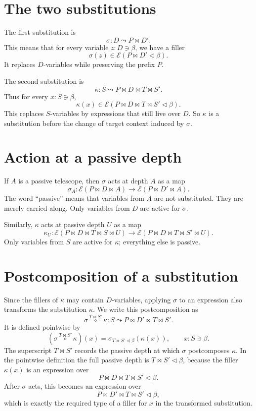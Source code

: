 \documentclass[11pt]{article}
\newcommand{\E}{\mathcal E}
\newcommand{\ext}{\mathbin{\triangleleft}}
\newcommand{\into}{\longrightarrow}
\newcommand{\pcomp}[3]{#1 \overset{#2}{\circ} #3}
\begin{document}
\section*{The two substitutions}

The first substitution is
\[
  \sigma : D \leadsto P \bowtie D'.
\]
This means that for every variable \(z : D \ni \beta\), we have a filler
\[
  \sigma(z) \in \E(P \bowtie D' \ext \beta).
\]
It replaces \(D\)-variables while preserving the prefix \(P\).

The second substitution is
\[
  \kappa : S \leadsto P \bowtie D \bowtie T \bowtie S'.
\]
Thus for every \(x : S \ni \beta\),
\[
  \kappa(x)
  \in
  \E(P \bowtie D \bowtie T \bowtie S' \ext \beta).
\]
This replaces \(S\)-variables by expressions that still live over \(D\).  So
\(\kappa\) is a substitution before the change of target context induced by
\(\sigma\).

\section*{Action at a passive depth}

If \(A\) is a passive telescope, then \(\sigma\) acts at depth \(A\) as a map
\[
  \sigma_A :
  \E(P \bowtie D \bowtie A)
  \into
  \E(P \bowtie D' \bowtie A).
\]
The word ``passive'' means that variables from \(A\) are not substituted.  They
are merely carried along.  Only variables from \(D\) are active for \(\sigma\).

Similarly, \(\kappa\) acts at passive depth \(U\) as a map
\[
  \kappa_U :
  \E(P \bowtie D \bowtie T \bowtie S \bowtie U)
  \into
  \E(P \bowtie D \bowtie T \bowtie S' \bowtie U).
\]
Only variables from \(S\) are active for \(\kappa\); everything else is passive.

\section*{Postcomposition of a substitution}

Since the fillers of \(\kappa\) may contain \(D\)-variables, applying \(\sigma\)
to an expression also transforms the substitution \(\kappa\).  We write this
postcomposition as
\[
  \pcomp{\sigma}{T \bowtie S'}{\kappa} :
  S \leadsto P \bowtie D' \bowtie T \bowtie S'.
\]
It is defined pointwise by
\[
  (\pcomp{\sigma}{T \bowtie S'}{\kappa})(x)
  =
  \sigma_{T \bowtie S' \ext \beta}(\kappa(x)),
  \qquad x : S \ni \beta.
\]
The superscript \(T \bowtie S'\) records the passive depth at which
\(\sigma\) postcomposes \(\kappa\).  In the pointwise definition the full
passive depth is \(T \bowtie S' \ext \beta\), because the filler
\(\kappa(x)\) is an expression over
\[
  P \bowtie D \bowtie T \bowtie S' \ext \beta.
\]
After \(\sigma\) acts, this becomes an expression over
\[
  P \bowtie D' \bowtie T \bowtie S' \ext \beta,
\]
which is exactly the required type of a filler for \(x\) in the transformed
substitution.
\end{document}
